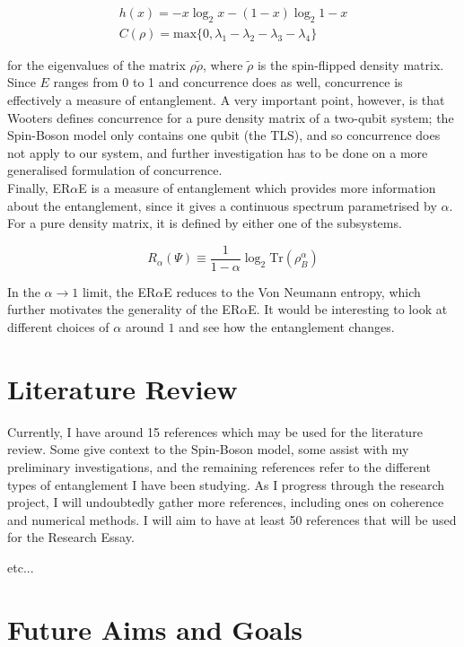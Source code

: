 \documentclass[12pt,a4paper]{article}
\begin{document}
\begin{align*}
    h(x) = -x\log_2{x} - (1-x)\log_2{1-x} \\
    C(\rho) = \text{max}\{0,\lambda_1-\lambda_2-\lambda_3-\lambda_4\}
\end{align*}

for the eigenvalues of the matrix $\rho \tilde{\rho}$, where $\tilde{\rho}$ is the spin-flipped density matrix. Since $E$ ranges from 0 to 1 and concurrence does as well, concurrence is effectively a measure of entanglement. A very important point, however, is that Wooters defines concurrence for a pure density matrix of a two-qubit system; the Spin-Boson model only contains one qubit (the TLS), and so concurrence does not apply to our system, and further investigation has to be done on a more generalised formulation of concurrence. 
\\
Finally, ER$\alpha$E is a measure of entanglement which provides more information about the entanglement, since it gives a continuous spectrum parametrised by $\alpha$. For a pure density matrix, it is defined by either one of the subsystems.

\begin{equation}
    R_{\alpha}(\Psi) \equiv \frac{1}{1-\alpha}\log_2{\text{Tr}(\rho_B^\alpha)}
\end{equation}

In the $\alpha \to 1$ limit, the ER$\alpha$E reduces to the Von Neumann entropy, which further motivates the generality of the ER$\alpha$E. It would be interesting to look at different choices of $\alpha$ around $1$ and see how the entanglement changes. 


\section{Literature Review}
Currently, I have around 15 references which may be used for the literature review. Some give context to the Spin-Boson model, some assist with my preliminary investigations, and the remaining references refer to the different types of entanglement I have been studying. As I progress through the research project, I will undoubtedly gather more references, including ones on coherence and numerical methods. I will aim to have at least 50 references that will be used for the Research Essay.

etc...


\section{Future Aims and Goals}



\newpage

 
 
\end{document}
